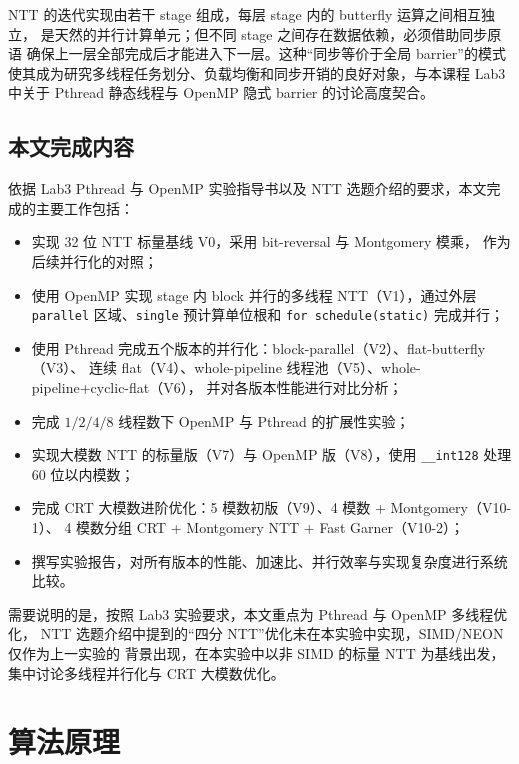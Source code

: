\documentclass[UTF8,a4paper,10pt]{ctexart}
\begin{document}
NTT 的迭代实现由若干 stage 组成，每层 stage 内的 butterfly 运算之间相互独立，
是天然的并行计算单元；但不同 stage 之间存在数据依赖，必须借助同步原语
确保上一层全部完成后才能进入下一层。这种“同步等价于全局 barrier”的模式
使其成为研究多线程任务划分、负载均衡和同步开销的良好对象，与本课程
Lab3 中关于 Pthread 静态线程与 OpenMP 隐式 barrier 的讨论高度契合。

\subsection{本文完成内容}

依据 Lab3 Pthread 与 OpenMP 实验指导书以及 NTT 选题介绍的要求，本文完成的主要工作包括：

\begin{itemize}
  \item 实现 32 位 NTT 标量基线 V0，采用 bit-reversal 与 Montgomery 模乘\cite{montgomery1985modular}，
        作为后续并行化的对照；
  \item 使用 OpenMP 实现 stage 内 block 并行的多线程 NTT（V1），通过外层 \texttt{parallel}
        区域、\texttt{single} 预计算单位根和 \texttt{for schedule(static)} 完成并行；
  \item 使用 Pthread 完成五个版本的并行化：block-parallel（V2）、flat-butterfly（V3）、
        连续 flat（V4）、whole-pipeline 线程池（V5）、whole-pipeline+cyclic-flat（V6），
        并对各版本性能进行对比分析；
  \item 完成 $1/2/4/8$ 线程数下 OpenMP 与 Pthread 的扩展性实验；
  \item 实现大模数 NTT 的标量版（V7）与 OpenMP 版（V8），使用 \texttt{\_\_int128}
        处理 60 位以内模数；
  \item 完成 CRT 大模数进阶优化：5 模数初版（V9）、4 模数 + Montgomery（V10-1）、
        4 模数分组 CRT + Montgomery NTT + Fast Garner（V10-2）；
  \item 撰写实验报告，对所有版本的性能、加速比、并行效率与实现复杂度进行系统比较。
\end{itemize}

需要说明的是，按照 Lab3 实验要求，本文重点为 Pthread 与 OpenMP 多线程优化，
NTT 选题介绍中提到的“四分 NTT”优化未在本实验中实现，SIMD/NEON 仅作为上一实验的
背景出现，在本实验中以非 SIMD 的标量 NTT 为基线出发，集中讨论多线程并行化与 CRT
大模数优化。

\section{算法原理}
\end{document}
